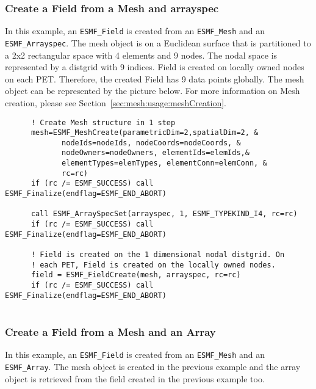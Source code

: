 
  \subsubsection{Create a Field from a Mesh and arrayspec}
  \label{sec:field:usage:create_mesh_arrayspec}
   
   In this example, an {\tt ESMF\_Field} is created from an {\tt ESMF\_Mesh} 
   and an {\tt ESMF\_Arrayspec}.
   The mesh object is on a Euclidean surface that is partitioned to a 2x2 rectangular
   space with 4 elements and 9 nodes. The nodal space is represented by
   a distgrid with 9 indices. Field is created on locally owned nodes on each PET.
   Therefore, the created Field has 9 data points globally.
   The mesh object can be represented by the picture
   below. For more information on Mesh creation, please see Section~\ref{sec:mesh:usage:meshCreation}.
   

 \begin{verbatim}
      ! Create Mesh structure in 1 step
      mesh=ESMF_MeshCreate(parametricDim=2,spatialDim=2, &
             nodeIds=nodeIds, nodeCoords=nodeCoords, &
             nodeOwners=nodeOwners, elementIds=elemIds,&
             elementTypes=elemTypes, elementConn=elemConn, &
             rc=rc)
      if (rc /= ESMF_SUCCESS) call ESMF_Finalize(endflag=ESMF_END_ABORT)

      call ESMF_ArraySpecSet(arrayspec, 1, ESMF_TYPEKIND_I4, rc=rc)
      if (rc /= ESMF_SUCCESS) call ESMF_Finalize(endflag=ESMF_END_ABORT)

      ! Field is created on the 1 dimensional nodal distgrid. On
      ! each PET, Field is created on the locally owned nodes.
      field = ESMF_FieldCreate(mesh, arrayspec, rc=rc)
      if (rc /= ESMF_SUCCESS) call ESMF_Finalize(endflag=ESMF_END_ABORT)
 
\end{verbatim}
 

  \subsubsection{Create a Field from a Mesh and an Array}
  \label{sec:field:usage:create_mesh_array}
   
   In this example, an {\tt ESMF\_Field} is created from an {\tt ESMF\_Mesh} 
   and an {\tt ESMF\_Array}. The mesh object is created in the previous example and
   the array object is retrieved from the field created in the previous example too.
   
